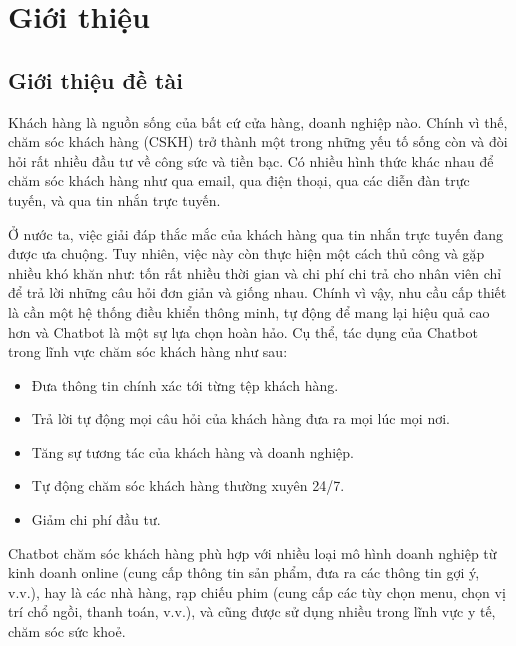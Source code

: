 \chapter {Giới thiệu}

\section{Giới thiệu đề tài}
Khách hàng là nguồn sống của bất cứ cửa hàng, doanh nghiệp nào.
Chính vì thế, chăm sóc khách hàng (CSKH) trở thành một trong những
yếu tố sống còn và đòi hỏi rất nhiều đầu tư về công sức và tiền bạc.
Có nhiều hình thức khác nhau để chăm sóc khách hàng như qua email,
qua điện thoại, qua các diễn đàn trực tuyến, và qua tin nhắn
trực tuyến.

Ở nước ta, việc giải đáp thắc mắc của khách hàng qua tin nhắn
trực tuyến đang được ưa chuộng. Tuy nhiên, việc này còn thực hiện
một cách thủ công và gặp nhiều khó khăn như: tốn rất nhiều
thời gian và chi phí chi trả cho nhân viên chỉ để trả lời những
câu hỏi đơn giản và giống nhau. Chính vì vậy, nhu cầu cấp thiết
là cần một hệ thống điều khiển thông minh, tự động để mang lại
hiệu quả cao hơn và Chatbot là một sự lựa chọn hoàn hảo. Cụ thể,
tác dụng của Chatbot trong lĩnh vực chăm sóc khách hàng như sau:

\begin{itemize}
    \item Đưa thông tin chính xác tới từng tệp khách hàng.
    \item Trả lời tự động mọi câu hỏi của khách hàng đưa ra
    mọi lúc mọi nơi.
    \item Tăng sự tương tác của khách hàng và doanh nghiệp.
    \item Tự động chăm sóc khách hàng thường xuyên 24/7.
    \item Giảm chi phí đầu tư.
\end{itemize}

Chatbot chăm sóc khách hàng phù hợp với nhiều loại mô hình
doanh nghiệp từ kinh doanh online (cung cấp thông tin sản phẩm,
đưa ra các thông tin gợi ý, v.v.), hay là các nhà hàng, rạp
chiếu phim (cung cấp các tùy chọn menu, chọn vị trí chổ ngồi,
thanh toán, v.v.), và cũng được sử dụng nhiều trong lĩnh vực
y tế, chăm sóc sức khoẻ.

